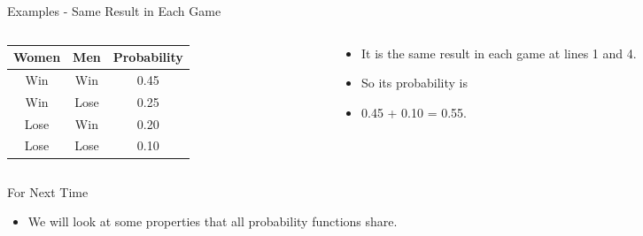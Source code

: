 \documentclass[
  ignorenonframetext,
]{beamer}
\providecommand{\tightlist}{%
  \setlength{\itemsep}{0pt}\setlength{\parskip}{0pt}}
\begin{document}
\begin{frame}{Examples - Same Result in Each Game}
\protect\hypertarget{examples---same-result-in-each-game}{}
\begin{columns}[T]
\begin{column}{0.48\textwidth}
\begin{longtable}[]{@{}ccc@{}}
\toprule
Women & Men & Probability \\
\midrule
\endhead
Win & Win & 0.45 \\
Win & Lose & 0.25 \\
Lose & Win & 0.20 \\
Lose & Lose & 0.10 \\
\bottomrule
\end{longtable}
\end{column}

\begin{column}{0.48\textwidth}
\bigskip

\begin{itemize}
\tightlist
\item
  It is the same result in each game at lines 1 and 4.
\item
  So its probability is
\item
  0.45 + 0.10 = 0.55.
\end{itemize}
\end{column}
\end{columns}
\end{frame}

\begin{frame}{For Next Time}
\protect\hypertarget{for-next-time}{}
\begin{itemize}
\tightlist
\item
  We will look at some properties that all probability functions share.
\end{itemize}
\end{frame}
\end{document}
